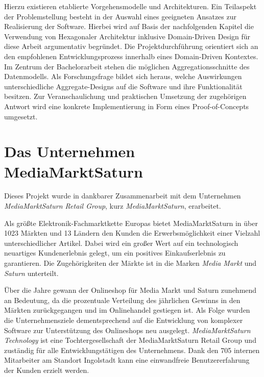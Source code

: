 Hierzu existieren etablierte Vorgehensmodelle und Architekturen. Ein Teilaspekt der Problemstellung besteht in der Auswahl eines geeigneten Ansatzes zur Realisierung der Software. Hierbei wird auf Basis der nachfolgenden Kapitel die Verwendung von Hexagonaler Architektur inklusive Domain-Driven Design für diese Arbeit argumentativ begründet. Die Projektdurchführung orientiert sich an den empfohlenen Entwicklungsprozess innerhalb eines Domain-Driven Kontextes. Im Zentrum der Bachelorarbeit stehen die möglichen Aggregationsschnitte des Datenmodells. Als Forschungsfrage bildet sich heraus, welche Auswirkungen unterschiedliche Aggregate-Designs auf die Software und ihre Funktionalität besitzen. Zur Veranschaulichung und praktischen Umsetzung der zugehörigen Antwort wird eine konkrete Implementierung in Form eines Proof-of-Concepts umgesetzt.



\section{Das Unternehmen MediaMarktSaturn}

Dieses Projekt wurde in dankbarer Zusammenarbeit mit dem Unternehmen \emph{MediaMarktSaturn Retail Group}, kurz \emph{MediaMarktSaturn}, erarbeitet.

Als größte Elektronik-Fachmarktkette Europas bietet MediaMarktSaturn in über 1023 Märkten und 13 Ländern den Kunden die Erwerbsmöglichkeit einer Vielzahl unterschiedlicher Artikel. Dabei wird ein großer Wert auf ein technologisch neuartiges Kundenerlebnis gelegt, um ein positives Einkaufserlebnis zu garantieren. Die Zugehörigkeiten der Märkte ist in die Marken \emph{Media Markt} und \emph{Saturn} unterteilt.

Über die Jahre gewann der Onlineshop für Media Markt und Saturn zunehmend an Bedeutung, da die prozentuale Verteilung des jährlichen Gewinns in den Märkten zurückgegangen und im Onlinehandel gestiegen ist. Als Folge wurden die Unternehmensziele dementsprechend auf die Entwicklung von komplexer Software zur Unterstützung des Onlineshops neu ausgelegt. \emph{MediaMarktSaturn Technology} ist eine Tochtergesellschaft der MediaMarktSaturn Retail Group und zuständig für alle Entwicklungstätigen des Unternehmens. Dank den 705 internen Mitarbeiter am Standort Ingolstadt kann eine einwandfreie Benutzererfahrung der Kunden erzielt werden. 

